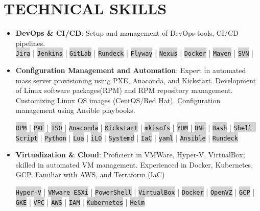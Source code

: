 \documentclass[11pt]{article}
\begin{document}
	\section*{{\fontsize{15}{0}\selectfont T}ECHNICAL SKILLS}
	\vspace{-1em}
	\begin{itemize}
		\item \textbf{DevOps \& CI/CD}: Setup and management of DevOps tools, CI/CD pipelines.\\
		\colorbox{lightgrey}{\texttt{Jira}} | \colorbox{lightgrey}{\texttt{Jenkins}} |
		\colorbox{lightgrey}{\texttt{GitLab}} |  \colorbox{lightgrey}{\texttt{Rundeck}} |
		\colorbox{lightgrey}{\texttt{Flyway}} |
		\colorbox{lightgrey}{\texttt{Nexus}} | \colorbox{lightgrey}{\texttt{Docker}} | \colorbox{lightgrey}{\texttt{Maven}} | \colorbox{lightgrey}{\texttt{SVN}} |  
		
		\item \textbf{Configuration Management and Automation}: Expert in automated mass server provisioning using PXE, Anaconda, and Kickstart. Development of Linux software packages(RPM) and RPM repository management. Customizing Linux OS images (CentOS/Red Hat). Configuration management using Ansible playbooks.
		
		\colorbox{lightgrey}{\texttt{RPM}} | \colorbox{lightgrey}{\texttt{PXE}} | \colorbox{lightgrey}{\texttt{ISO}} | \colorbox{lightgrey}{\texttt{Anaconda}} | \colorbox{lightgrey}{\texttt{Kickstart}} |
		\colorbox{lightgrey}{\texttt{mkisofs}} | \colorbox{lightgrey}{\texttt{YUM}} | \colorbox{lightgrey}{\texttt{DNF}} | \colorbox{lightgrey}{\texttt{Bash}} | \colorbox{lightgrey}{\texttt{Shell Script}} | \colorbox{lightgrey}{\texttt{Python}} | \colorbox{lightgrey}{\texttt{Lua}} | \colorbox{lightgrey}{\texttt{iLO}} | \colorbox{lightgrey}{\texttt{Systemd}} | \colorbox{lightgrey}{\texttt{IaC}} | \colorbox{lightgrey}{\texttt{yaml}} | \colorbox{lightgrey}{\texttt{Ansible}} | \colorbox{lightgrey}{\texttt{Rundeck}}
		
		\item \textbf{Virtualization \& Cloud}: Proficient in VMWare, Hyper-V, VirtualBox; skilled in automated VM management. Experienced in Docker, Kubernetes, GCP. Familiar with AWS, and Terraform (IaC)
		
		\colorbox{lightgrey}{\texttt{Hyper-V}} | \colorbox{lightgrey}{\texttt{VMware ESXi}} | \colorbox{lightgrey}{\texttt{PowerShell}} | \colorbox{lightgrey}{\texttt{VirtualBox}} | \colorbox{lightgrey}{\texttt{Docker}} | \colorbox{lightgrey}{\texttt{OpenVZ}} | \colorbox{lightgrey}{\texttt{GCP}} | \colorbox{lightgrey}{\texttt{GKE}} | \colorbox{lightgrey}{\texttt{VPC}} | \colorbox{lightgrey}{\texttt{AWS}} | \colorbox{lightgrey}{\texttt{IAM}} | \colorbox{lightgrey}{\texttt{Kubernetes}} | \colorbox{lightgrey}{\texttt{Helm}}
		

\end{itemize}
\end{document}
